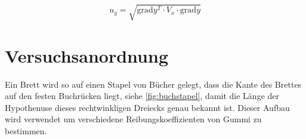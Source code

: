 \documentclass[11pt,ngerman]{scrartcl}
\begin{document}
\begin{equation}
    \label{eq:graduncentainty}
    u_y = \sqrt{\mathrm{grad} y^T \cdot V_x \cdot \mathrm{grad} y}
\end{equation}

\section{Versuchsanordnung}
\label{sec:versuchsanordnung}

Ein Brett wird so auf einen Stapel von Bücher gelegt, dass die Kante des
Brettes auf den festen Buchrücken liegt, siehe \autoref{fig:buchstapel},
damit die Länge der Hypothenuse dieses rechtwinkligen Dreiecks genau bekannt ist.
Dieser Aufbau wird verwendet um verschiedene Reibungskoeffizienten von Gummi
zu bestimmen.
\end{document}
